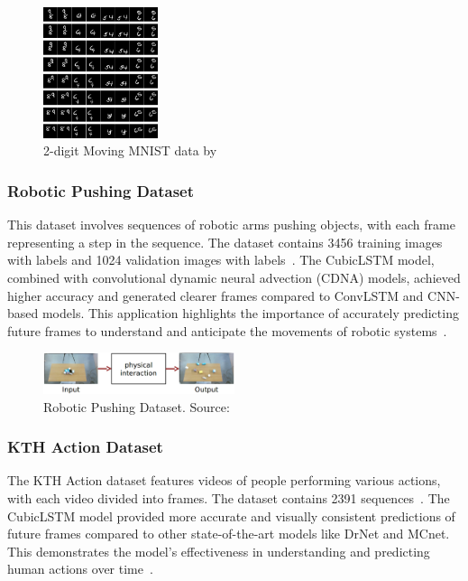 \documentclass[12pt,oneside]{book} %
\begin{document}
\begin{figure}[H]
    \centering
    \includegraphics[width=0.3\textwidth]{figures/2-digit-Moving-MNIST-data-Fig-5-3-digit-Moving-MNIST-data.jpeg}
    \caption{2-digit Moving MNIST data by~\citet{DBLP:journals/corr/SrivastavaMS15}}\label{fig:moving-mnist}
\end{figure}

\subsubsection*{Robotic Pushing Dataset}

This dataset involves sequences of robotic arms pushing objects, with each
frame representing a step in the sequence. The dataset contains 3456 training
images with labels and 1024 validation images with
labels~\cite{DBLP:journals/corr/FinnGL16}. The CubicLSTM model, combined with
convolutional dynamic neural advection (CDNA) models, achieved higher accuracy
and generated clearer frames compared to ConvLSTM and CNN-based models. This
application highlights the importance of accurately predicting future frames to
understand and anticipate the movements of robotic
systems~\cite{CubicLSTMsVideoPrediction}.

\begin{figure}[H]
    \centering
    \includegraphics[width=0.5\textwidth]{figures/robotpush.png}
    \caption{Robotic Pushing Dataset. Source:~\citet{DBLP:journals/corr/EitelHB17}}\label{fig:robotic-pushing-dataset}
\end{figure}

\subsubsection*{KTH Action Dataset}

The KTH Action dataset features videos of people performing various actions,
with each video divided into frames. The dataset contains 2391
sequences~\cite{KTH}. The CubicLSTM model provided more accurate and visually
consistent predictions of future frames compared to other state-of-the-art
models like DrNet and MCnet. This demonstrates the model's effectiveness in
understanding and predicting human actions over
time~\cite{CubicLSTMsVideoPrediction}.
\end{document}
